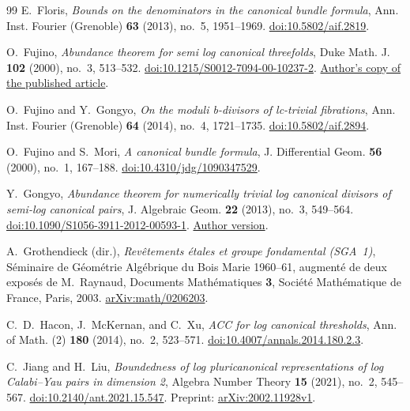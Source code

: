 \begin{thebibliography}{99}
E.~Floris, \emph{Bounds on the denominators in the canonical bundle formula},
Ann. Inst. Fourier (Grenoble) \textbf{63} (2013), no.~5, 1951--1969.
\href{https://doi.org/10.5802/aif.2819}{doi:10.5802/aif.2819}.

O.~Fujino,
\emph{Abundance theorem for semi log canonical threefolds},
Duke Math. J. \textbf{102} (2000), no.~3, 513--532.
\href{https://doi.org/10.1215/S0012-7094-00-10237-2}{doi:10.1215/S0012-7094-00-10237-2}.
\href{https://www.math.kyoto-u.ac.jp/~fujino/Abundance.pdf}{Author's copy of the published article}.

O.~Fujino and Y.~Gongyo,
\emph{On the moduli b-divisors of lc-trivial fibrations},
Ann. Inst. Fourier (Grenoble) \textbf{64} (2014), no.~4, 1721--1735.
\href{https://doi.org/10.5802/aif.2894}{doi:10.5802/aif.2894}.

O.~Fujino and S.~Mori, \emph{A canonical bundle formula},
J. Differential Geom. \textbf{56} (2000), no.~1, 167--188.
\href{https://doi.org/10.4310/jdg/1090347529}{doi:10.4310/jdg/1090347529}.

Y.~Gongyo,
\emph{Abundance theorem for numerically trivial log canonical divisors of semi-log canonical pairs},
J. Algebraic Geom. \textbf{22} (2013), no.~3, 549--564.
\href{https://doi.org/10.1090/S1056-3911-2012-00593-1}{doi:10.1090/S1056-3911-2012-00593-1}.
\href{https://www.ms.u-tokyo.ac.jp/~gongyo/papers/abundance_sub7.pdf}{Author version}.

A.~Grothendieck (dir.),
\emph{Rev\^etements \'etales et groupe fondamental (SGA~1)},
S\'eminaire de G\'eom\'etrie Alg\'ebrique du Bois Marie 1960--61,
augment\'e de deux expos\'es de M.~Raynaud,
Documents Math\'ematiques \textbf{3},
Soci\'et\'e Math\'ematique de France, Paris, 2003.
\href{https://arxiv.org/abs/math/0206203}{arXiv:math/0206203}.

C.~D.~Hacon, J.~McKernan, and C.~Xu,
\emph{ACC for log canonical thresholds},
Ann. of Math. (2) \textbf{180} (2014), no.~2, 523--571.
\href{https://doi.org/10.4007/annals.2014.180.2.3}{doi:10.4007/annals.2014.180.2.3}.

C.~Jiang and H.~Liu,
\emph{Boundedness of log pluricanonical representations of log Calabi--Yau
pairs in dimension 2},
Algebra Number Theory \textbf{15} (2021), no.~2, 545--567.
\href{https://doi.org/10.2140/ant.2021.15.547}{doi:10.2140/ant.2021.15.547}.
Preprint: \href{https://arxiv.org/abs/2002.11928v1}{arXiv:2002.11928v1}.


\end{thebibliography}
